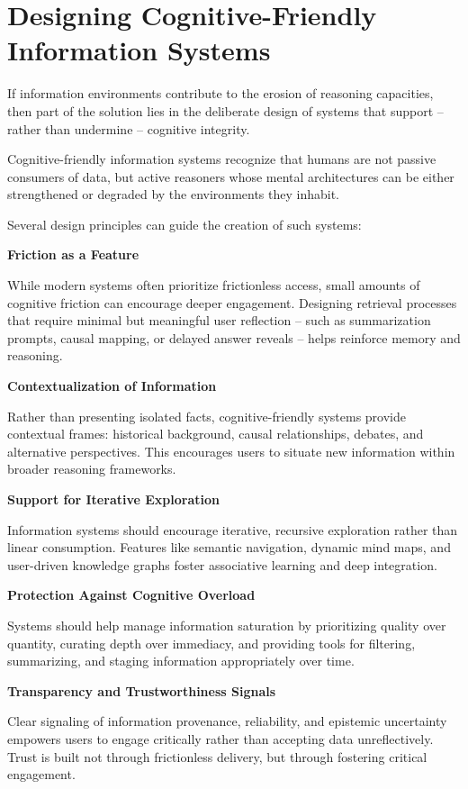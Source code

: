 \section{Designing Cognitive-Friendly Information Systems}

If information environments contribute to the erosion of reasoning
capacities, then part of the solution lies in the deliberate design of
systems that support -- rather than undermine -- cognitive integrity.

Cognitive-friendly information systems recognize that humans are not
passive consumers of data, but active reasoners whose mental
architectures can be either strengthened or degraded by the environments
they inhabit.

Several design principles can guide the creation of such systems:

\textbf{Friction as a Feature}

While modern systems often prioritize frictionless access, small amounts
of cognitive friction can encourage deeper engagement. Designing
retrieval processes that require minimal but meaningful user reflection
-- such as summarization prompts, causal mapping, or delayed answer
reveals -- helps reinforce memory and reasoning.

\textbf{Contextualization of Information}

Rather than presenting isolated facts, cognitive-friendly systems
provide contextual frames: historical background, causal relationships,
debates, and alternative perspectives. This encourages users to situate
new information within broader reasoning frameworks.

\textbf{Support for Iterative Exploration}

Information systems should encourage iterative, recursive exploration
rather than linear consumption. Features like semantic navigation,
dynamic mind maps, and user-driven knowledge graphs foster associative
learning and deep integration.

\textbf{Protection Against Cognitive Overload}

Systems should help manage information saturation by prioritizing
quality over quantity, curating depth over immediacy, and providing
tools for filtering, summarizing, and staging information appropriately
over time.

\textbf{Transparency and Trustworthiness Signals}

Clear signaling of information provenance, reliability, and epistemic
uncertainty empowers users to engage critically rather than accepting
data unreflectively. Trust is built not through frictionless delivery,
but through fostering critical engagement.

